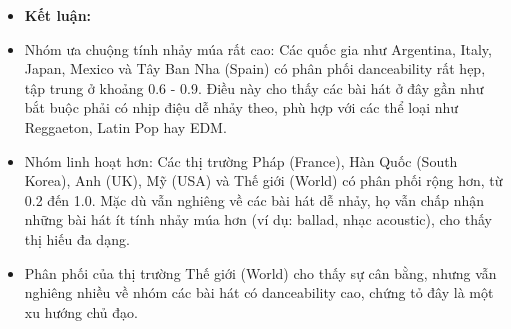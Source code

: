 \begin{itemize}
            
            \begin{itemize}
                \item \textbf{Kết luận: }
                
                \item Nhóm ưa chuộng tính nhảy múa rất cao: Các quốc gia như Argentina, Italy, Japan, Mexico và Tây Ban Nha (Spain) có phân phối danceability rất hẹp, tập trung ở khoảng 0.6 - 0.9. Điều này cho thấy các bài hát ở đây gần như bắt buộc phải có nhịp điệu dễ nhảy theo, phù hợp với các thể loại như Reggaeton, Latin Pop hay EDM.
        
                \item Nhóm linh hoạt hơn: Các thị trường Pháp (France), Hàn Quốc (South Korea), Anh (UK), Mỹ (USA) và Thế giới (World) có phân phối rộng hơn, từ 0.2 đến 1.0. Mặc dù vẫn nghiêng về các bài hát dễ nhảy, họ vẫn chấp nhận những bài hát ít tính nhảy múa hơn (ví dụ: ballad, nhạc acoustic), cho thấy thị hiếu đa dạng.
        
                \item Phân phối của thị trường Thế giới (World)  cho thấy sự cân bằng, nhưng vẫn nghiêng nhiều về nhóm các bài hát có danceability cao, chứng tỏ đây là một xu hướng chủ đạo.
            \end{itemize}

    
    
\end{itemize}


